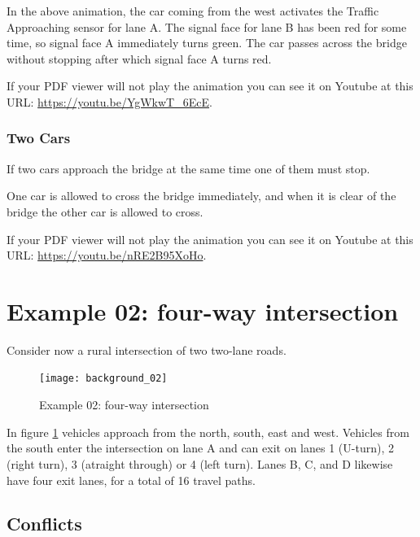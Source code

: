 \documentclass[letterpaper,twoside]{article}
\begin{document}
In the above animation, the car coming from the west activates the Traffic
Approaching sensor for lane A.  The signal face for lane B has been red
for some time, so signal face A immediately turns green.  The car passes
across the bridge without stopping after which signal face A turns red.

If your PDF viewer will not play the animation you can see it on Youtube
at this URL: 
\href{https://youtu.be/YgWkwT\_6EcE}{https://youtu.be/YgWkwT\_6EcE}.

\subsubsection{Two Cars}

If two cars approach the bridge at the same time one of them must stop.

\noindent{}

One car is allowed to cross the bridge immediately, and when it is
clear of the bridge the other car is allowed to cross.

If your PDF viewer will not play the animation you can see it on Youtube
at this URL:
\href{https://youtu.be/nRE2B95XoHo}{https://youtu.be/nRE2B95XoHo}.

\section{Example 02: four-way intersection}

Consider now a rural intersection of two two-lane roads.

\begin{figure}[htb]
  {\texttt{[image: background\_02]}}
  {\caption{Example 02: four-way intersection}
    \label{fig:four-way_intersection}}
\end{figure}

In figure \ref{fig:four-way_intersection} vehicles approach from the
north, south, east and west.  Vehicles from the south enter the intersection
on lane A and can exit on lanes 1 (U-turn), 2 (right turn), 3 (atraight
through) or 4 (left turn).  Lanes B, C, and D likewise have four exit
lanes, for a total of \num{16} travel paths.

\subsection{Conflicts}
\end{document}

